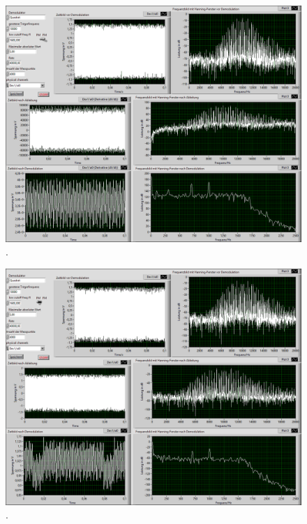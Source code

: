 \documentclass[
a4paper,
12pt,
pagesize,
ngerman
]{scrartcl}
\begin{document}
	\begin{figure}[H]
		\centering
		\includegraphics[width=1.0\textwidth]{EIRE2018Dateien/Tag4/OsziFMPM-Demod/FM/OsziPlusFMPMp}
		\caption{.}
	\end{figure}

	\begin{figure}[H]
		\centering
		\includegraphics[width=1.0\textwidth]{EIRE2018Dateien/Tag4/OsziFMPM-Demod/PM/OsziPlusFMPMp}
		\caption{.}
	\end{figure}

\end{document}
